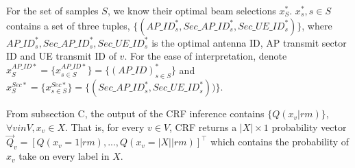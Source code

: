 \documentclass[conference]{IEEEtran}
\begin{document}
For the set of samples $S$, we know their optimal beam selections $x^{*}_{S}$. $x^{*}_{s},s\in S$ contains a set of three tuples, $\{(AP\_ID^{*}_{s}, Sec\_AP\_ID^{*}_{s}, Sec\_UE\_ID^{*}_{s})\}$, where $AP\_ID^{*}_{s}, Sec\_AP\_ID^{*}_{s}, Sec\_UE\_ID^{*}_{s}$ is the optimal antenna ID, AP transmit sector ID and UE transmit ID of $v$. For the ease of interpretation, denote $x^{AP\_ID*}_{S}=\{x^{AP\_ID*}_{s\in S}\}=\{(AP\_ID)^{*}_{s\in S}\}$ and $x^{Sec*}_{S}=\{x^{Sec*}_{s\in S}\}=\{(Sec\_AP\_ID^{*}_{s}, Sec\_UE\_ID^{*}_{s}))\}$. 

From subsection C, the output of the CRF inference contains $\{Q(x_{v}|rm)\}$, $\forall v in V, x_{v}\in X$. That is, for every $v\in V$, CRF returns a $|X|\times 1$ probability vector $\vec{Q}_{v}=[Q(x_{v}=1|rm),...,Q(x_{v}=|X||rm)]^\top$ which contains the probability of $x_{v}$ take on every label in $X$. %

\end{document}
